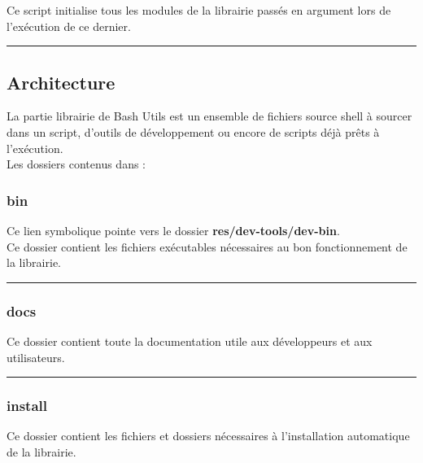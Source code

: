 \documentclass[a4paper,10pt]{article}
\begin{document}
Ce script initialise tous les modules de la librairie passés en argument lors de l'exécution de ce dernier.\\[1\baselineskip]



\color{green}\par\noindent\rule{\textwidth}{0.4pt}\color{white}

\color{green}
\subsection{Architecture}\color{white}
La partie librairie de Bash Utils est un ensemble de fichiers source shell à sourcer dans un script, d'outils de développement ou encore de scripts déjà prêts à l'exécution.\\[1\baselineskip]

Les dossiers contenus dans  :
\color{blue}
\subsubsection{bin}\color{white}
Ce lien symbolique pointe vers le dossier \textbf{\color{lime}res/dev-tools/dev-bin\color{white}}.\\[1\baselineskip]

Ce dossier contient les fichiers exécutables nécessaires au bon fonctionnement de la librairie.\\[1\baselineskip]



\color{blue}\par\noindent\rule{\textwidth}{0.4pt}\color{white}

\color{blue}
\subsubsection{docs}\color{white}
Ce dossier contient toute la documentation utile aux développeurs et aux utilisateurs.\\[1\baselineskip]



\color{blue}\par\noindent\rule{\textwidth}{0.4pt}\color{white}

\color{blue}
\subsubsection{install}\color{white}
Ce dossier contient les fichiers et dossiers nécessaires à l'installation automatique de la librairie.\\[1\baselineskip]
\end{document}
